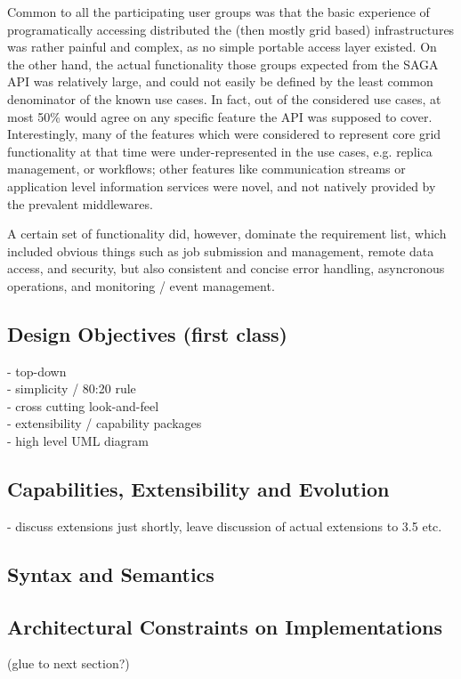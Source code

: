   Common to all the participating user groups was that the basic
  experience of programatically accessing distributed the (then mostly
  grid based) infrastructures was rather painful and complex, as no
  simple portable access layer existed.  On the other hand, the actual
  functionality those groups expected from the SAGA API was relatively
  large, and could not easily be defined by the least common
  denominator of the known use cases.  In fact, out of the considered
  use cases, at most 50\% would agree on any specific feature the API
  was supposed to cover.  Interestingly, many of the features which
  were considered to represent core grid functionality at that time
  were under-represented in the use cases, e.g. replica management, or
  workflows; other features like communication streams or application
  level information services were novel, and not natively provided by
  the prevalent middlewares.

  A certain set of functionality did, however, dominate the
  requirement list, which included obvious things such as job
  submission and management, remote data access, and security, but
  also consistent and concise error handling, asyncronous operations,
  and monitoring / event management.




 \subsection{Design Objectives (first class)}
  - top-down\\
  - simplicity / 80:20 rule\\
  - cross cutting look-and-feel\\
  - extensibility / capability packages\\

  - high level UML diagram\\


 \subsection{Capabilities, Extensibility and Evolution}
  - discuss extensions just shortly, leave discussion of actual extensions to
  3.5 etc.\\
  

 \subsection{Syntax and Semantics}


 \subsection{Architectural Constraints on Implementations}
   (glue to next section?)


